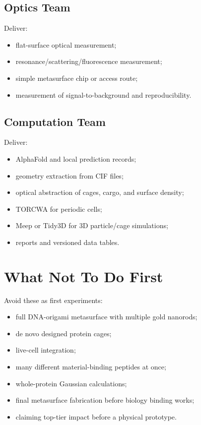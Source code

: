 \documentclass[11pt]{article}
\newcommand{\af}{AlphaFold}
\begin{document}
\subsection{Optics Team}

Deliver:

\begin{itemize}
\item flat-surface optical measurement;
\item resonance/scattering/fluorescence measurement;
\item simple metasurface chip or access route;
\item measurement of signal-to-background and reproducibility.
\end{itemize}

\subsection{Computation Team}

Deliver:

\begin{itemize}
\item \af{} and local prediction records;
\item geometry extraction from CIF files;
\item optical abstraction of cages, cargo, and surface density;
\item TORCWA for periodic cells;
\item Meep or Tidy3D for 3D particle/cage simulations;
\item reports and versioned data tables.
\end{itemize}

\section{What Not To Do First}

Avoid these as first experiments:

\begin{itemize}
\item full DNA-origami metasurface with multiple gold nanorods;
\item de novo designed protein cages;
\item live-cell integration;
\item many different material-binding peptides at once;
\item whole-protein Gaussian calculations;
\item final metasurface fabrication before biology binding works;
\item claiming top-tier impact before a physical prototype.
\end{itemize}
\end{document}
